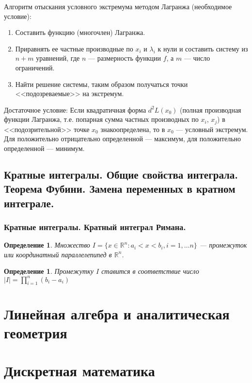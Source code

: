 \documentclass[12pt]{report}
\theoremstyle{plain}
\newtheorem{definition}[theorem]{Определение}
\newcommand{\R}{\mathbb R}
\begin{document}
Алгоритм отыскания условного экстремума методом Лагранжа (необходимое условие):
\begin{enumerate}
\item Составить функцию (многочлен) Лагранжа.
\item Приравнять ее частные производные по $x_i$ и $\lambda_i$ к нули и составить систему
из $n + m$ уравнений, где $n$ --- размерность функции $f$, а $m$ --- число ограничений.
\item Найти решение системы, таким образом получаться точки <<подозреваемые>> на экстремум.
\end{enumerate}

Достаточное условие:
Если квадратичная форма $d^2 L(x_0)$ (полная производная функции Лагранжа, т.е. попарная сумма
частных производных по $x_i$, $x_j$) в <<подозрительной>> точке $x_0$ знакоопределена, то в
$x_0$ --- условный экстремум. Для положительно отрицательно определенной --- максимум, для
положительно определенной --- минимум.


\section{Кратные интегралы. Общие свойства интеграла. Теорема Фубини. Замена переменных в кратном интеграле.}
\subsection{Кратные интегралы. Кратный интеграл Римана.}
\begin{definition}
Множество $I = \{x \in \R^n: a_i < x < b_i, i=1, \dots n\}$ --- промежуток или координатный
параллелепипед в $\R^n$.
\end{definition}

\begin{definition}
Промежутку $I$ ставится в соответствие число $|I| = \prod\limits_{i=1}^n (b_i - a_i)$
\end{definition}

\chapter{Линейная алгебра и аналитическая геометрия}

\chapter{Дискретная математика}
\end{document}
